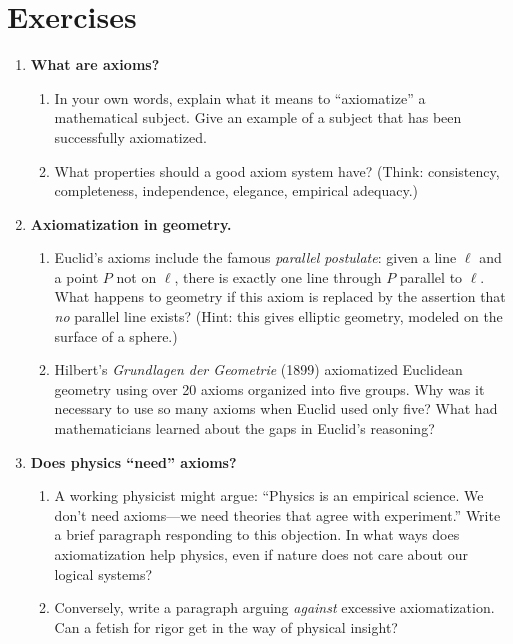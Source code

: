 \section*{Exercises}

\begin{enumerate}
    \item \textbf{What are axioms?}
    \begin{enumerate}
        \item In your own words, explain what it means to ``axiomatize'' a mathematical subject. Give an example of a subject that has been successfully axiomatized.
        \item What properties should a good axiom system have? (Think: consistency, completeness, independence, elegance, empirical adequacy.)
    \end{enumerate}

    \item \textbf{Axiomatization in geometry.}
    \begin{enumerate}
        \item Euclid's axioms include the famous \emph{parallel postulate}: given a line $\ell$ and a point $P$ not on $\ell$, there is exactly one line through $P$ parallel to $\ell$. What happens to geometry if this axiom is replaced by the assertion that \emph{no} parallel line exists? (Hint: this gives elliptic geometry, modeled on the surface of a sphere.)
        \item Hilbert's \emph{Grundlagen der Geometrie} (1899) axiomatized Euclidean geometry using over 20 axioms organized into five groups. Why was it necessary to use so many axioms when Euclid used only five? What had mathematicians learned about the gaps in Euclid's reasoning?
    \end{enumerate}

    \item \textbf{Does physics ``need'' axioms?}
    \begin{enumerate}
        \item A working physicist might argue: ``Physics is an empirical science. We don't need axioms---we need theories that agree with experiment.'' Write a brief paragraph responding to this objection. In what ways does axiomatization help physics, even if nature does not care about our logical systems?
        \item Conversely, write a paragraph arguing \emph{against} excessive axiomatization. Can a fetish for rigor get in the way of physical insight?
    \end{enumerate}


\end{enumerate}
